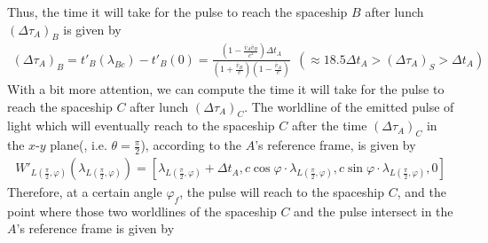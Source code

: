 \documentclass[12pt]{article}
\begin{document}
Thus, the time it will take for the pulse to reach the spaceship $B$ after lunch $(\Delta \tau_A)_B$ is given by
\begin{gather*}
(\Delta \tau_A)_B = t'_{B}(\lambda_{Bc}) - t'_{B}(0) = \frac{\left(1 - \frac{\bar{v}_A \bar{v}_B}{c^2}\right) \Delta t_A}{\left( 1 + \frac{\bar{v}_B}{c}\right) \left( 1 - \frac{\bar{v}_A}{c}\right)} ~~(\approx 18.5 \Delta t_A > (\Delta \tau_A)_S > \Delta t_A)
\end{gather*}
With a bit more attention, we can compute the time it will take for the pulse to reach the spaceship $C$ after lunch $(\Delta \tau_A)_C$.
The worldline of the emitted pulse of light which will eventually reach to the spaceship $C$ after the time $(\Delta \tau_A)_C$ in the $x$-$y$ plane(, i.e. $\theta = \frac{\pi}{2}$), according to the $A$'s reference frame, is given by
\begin{gather*}
W'_{L(\frac{\pi}{2},\varphi)}(\lambda_{L(\frac{\pi}{2}, \varphi)}) = \left[\lambda_{L(\frac{\pi}{2},\varphi)} + \Delta t_A, c \cos{\varphi} \cdot \lambda_{L(\frac{\pi}{2},\varphi)}, c \sin{\varphi} \cdot \lambda_{L(\frac{\pi}{2},\varphi)}, 0 \right]
\end{gather*}
Therefore, at a certain angle $\varphi_f$, the pulse will reach to the spaceship $C$, and the point where those two worldlines of the spaceship $C$ and the pulse intersect in the $A$'s reference frame is given by
\end{document}
